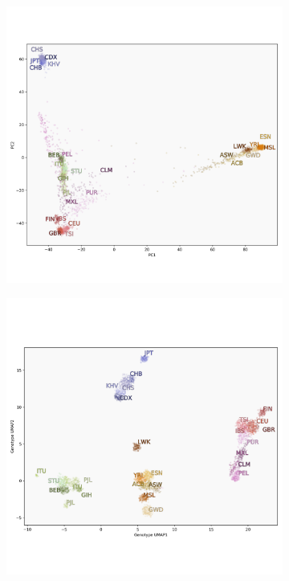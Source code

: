 \documentclass[12pt]{article}
\begin{document}

\clearpage

\begin{figure}[h!]
  \centering
  \begin{subfigure}[b]{0.45\linewidth}
    \includegraphics[width=\linewidth]{code/images/1KGP_PCA.png}
    \caption{}
    \label{fig:PCA}
  \end{subfigure}
  \begin{subfigure}[b]{0.45\linewidth}
    \includegraphics[width=\linewidth]{code/images/1KGP_genotype_UMAP.png}

\end{subfigure}
\end{figure}
\end{document}

